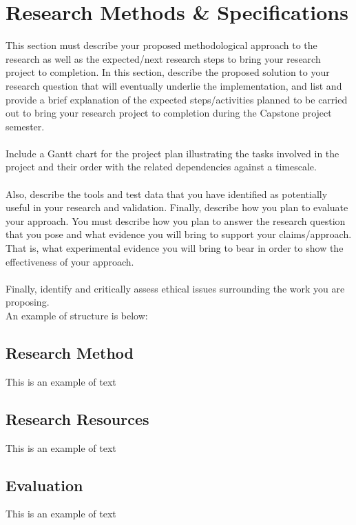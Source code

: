 \documentclass[10pt]{article}
\begin{document}
\section{Research Methods \& Specifications} 

This section must describe your proposed methodological approach to the research as well as the expected/next research steps to bring your research project to completion. In this section, describe the proposed solution to your research question that will eventually underlie the implementation, and list and provide a brief explanation of the expected steps/activities planned to be carried out to bring your research project to completion during the Capstone project semester. 
\\\\
Include a Gantt chart for the project plan illustrating the tasks involved in the project and their order with the related dependencies against a timescale.
\\\\
Also, describe the tools and test data that you have identified as potentially useful in your research and validation. Finally, describe how you plan to evaluate your approach. You must describe how you plan to answer the research question that you pose and what evidence you will bring to support your claims/approach. That is, what experimental evidence you will bring to bear in order to show the effectiveness of your approach.
\\\\
Finally, identify and critically assess ethical issues surrounding the work you are proposing.
\\
An example of structure is below:

\subsection{Research Method}
This is an example of text

\subsection{Research Resources}
This is an example of text

\subsection{Evaluation}
This is an example of text
\end{document}
